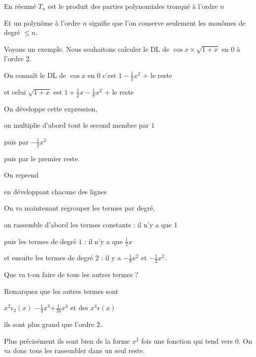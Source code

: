En résumé 
$T_n$ est le produit des parties polynomiales 
tronqué à l'ordre $n$

\change

Et  un polynôme à l'ordre $n$ signifie que l'on conserve seulement 
les monômes de degré $\le n$. 


\diapo

Voyons un exemple. Nous souhaitons calculer le DL de 
$\cos x \times \sqrt{1+x}$ en $0$  à l'ordre $2$.  

\change

On connaît le DL de $\cos x$ en $0$ c'est 
$1-\frac{1}{2}x^2$ + le reste


\change

et celui 
$\sqrt{1+x}$ est $1+\frac{1}{2}x-\frac{1}{8}x^2$ + le reste

\change

On développe cette expression,

on multiplie d'abord tout le second membre par $1$

\change

puis par $-\frac{1}{2}x^2$

\change

puis par le premier reste.


\change

On reprend


\change 

en développant chacune des lignes

\change


\change

On va maintenant regrouper les termes par degré,

on rassemble d'abord les termes constants : il n'y a que $1$

puis les termes de degré $1$ : il n'y a que $\frac12 x$

et ensuite les termes de degré $2$ : il y a $-\frac{1}{8}x^2$ et $-\frac{1}{2}x^2$.

\change

Que va t-on faire de tous les autres termes ?

Remarquez que les autres termes sont

$x^2\epsilon_2(x)$ $-\frac{1}{4}x^3$+$\frac{1}{16}x^4$ et des $x^4 \epsilon(x)$

ils sont plus grand que l'ordre $2$.

Plus précisément ils sont bien de la forme $x^2$ fois une fonction qui tend vers $0$.
On va donc tous les rassembler dans un seul reste.

